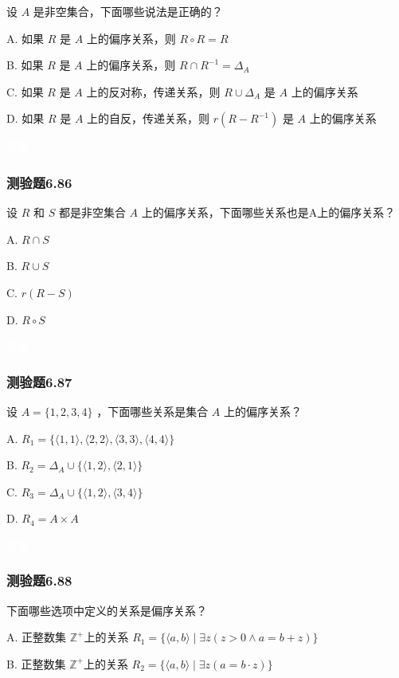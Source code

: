 \documentclass[UTF8, heading=true]{ctexart}
\begin{document}
设 $A$ 是非空集合，下面哪些说法是正确的？

A. 如果 $R$ 是 $A$ 上的偏序关系，则 $R \circ R=R$

B. 如果 $R$ 是 $A$ 上的偏序关系，则 $R \cap R^{-1}=\Delta_A$

C. 如果 $R$ 是 $A$ 上的反对称，传递关系，则 $R \cup \Delta_A$ 是 $A$ 上的偏序关系

D.  如果 $R$ 是 $A$ 上的自反，传递关系，则 $r\left(R-R^{-1}\right)$ 是 $A$ 上的偏序关系


\textcolor{white}{答案：ABCD}


\subsubsection{测验题6.86}

设 $R$ 和 $S$ 都是非空集合 $A$ 上的偏序关系，下面哪些关系也是A上的偏序关系？

A. $R \cap S$

B. $R \cup S$

C. $r(R-S)$

D. $R \circ S$

\textcolor{white}{答案：A}


\subsubsection{测验题6.87}

设 $A=\{1,2,3,4\}$ ，下面哪些关系是集合 $A$ 上的偏序关系？


A. $
R_1=\{\langle 1,1\rangle,\langle 2,2\rangle,\langle 3,3\rangle,\langle 4,4\rangle\}
$

B. $R_2=\Delta_A \cup\{\langle 1,2\rangle,\langle 2,1\rangle\}$

C. $R_3=\Delta_A \cup\{\langle 1,2\rangle,\langle 3,4\rangle\}$

D. $R_4=A \times A$

\textcolor{white}{答案：AC}

\subsubsection{测验题6.88}

下面哪些选项中定义的关系是偏序关系？

A. 正整数集 $\mathbb{Z}^{+}$上的关系 $R_1=\{\langle a, b\rangle \mid \exists z(z>0 \wedge a=b+z)\}$

B. 正整数集 $\mathbb{Z}^{+}$上的关系 $R_2=\{\langle a, b\rangle \mid \exists z(a=b \cdot z)\}$
\end{document}
